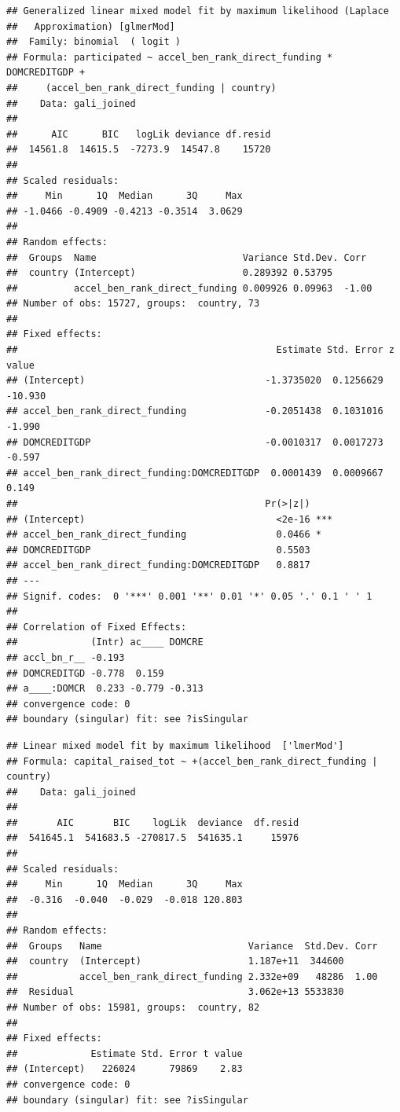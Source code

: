 \documentclass[
  english,
  man]{apa6}
\begin{document}
\begin{verbatim}
## Generalized linear mixed model fit by maximum likelihood (Laplace
##   Approximation) [glmerMod]
##  Family: binomial  ( logit )
## Formula: participated ~ accel_ben_rank_direct_funding * DOMCREDITGDP +  
##     (accel_ben_rank_direct_funding | country)
##    Data: gali_joined
## 
##      AIC      BIC   logLik deviance df.resid 
##  14561.8  14615.5  -7273.9  14547.8    15720 
## 
## Scaled residuals: 
##     Min      1Q  Median      3Q     Max 
## -1.0466 -0.4909 -0.4213 -0.3514  3.0629 
## 
## Random effects:
##  Groups  Name                          Variance Std.Dev. Corr 
##  country (Intercept)                   0.289392 0.53795       
##          accel_ben_rank_direct_funding 0.009926 0.09963  -1.00
## Number of obs: 15727, groups:  country, 73
## 
## Fixed effects:
##                                              Estimate Std. Error z value
## (Intercept)                                -1.3735020  0.1256629 -10.930
## accel_ben_rank_direct_funding              -0.2051438  0.1031016  -1.990
## DOMCREDITGDP                               -0.0010317  0.0017273  -0.597
## accel_ben_rank_direct_funding:DOMCREDITGDP  0.0001439  0.0009667   0.149
##                                            Pr(>|z|)    
## (Intercept)                                  <2e-16 ***
## accel_ben_rank_direct_funding                0.0466 *  
## DOMCREDITGDP                                 0.5503    
## accel_ben_rank_direct_funding:DOMCREDITGDP   0.8817    
## ---
## Signif. codes:  0 '***' 0.001 '**' 0.01 '*' 0.05 '.' 0.1 ' ' 1
## 
## Correlation of Fixed Effects:
##             (Intr) ac____ DOMCRE
## accl_bn_r__ -0.193              
## DOMCREDITGD -0.778  0.159       
## a____:DOMCR  0.233 -0.779 -0.313
## convergence code: 0
## boundary (singular) fit: see ?isSingular
\end{verbatim}

\begin{verbatim}
## Linear mixed model fit by maximum likelihood  ['lmerMod']
## Formula: capital_raised_tot ~ +(accel_ben_rank_direct_funding | country)
##    Data: gali_joined
## 
##       AIC       BIC    logLik  deviance  df.resid 
##  541645.1  541683.5 -270817.5  541635.1     15976 
## 
## Scaled residuals: 
##     Min      1Q  Median      3Q     Max 
##  -0.316  -0.040  -0.029  -0.018 120.803 
## 
## Random effects:
##  Groups   Name                          Variance  Std.Dev. Corr
##  country  (Intercept)                   1.187e+11  344600      
##           accel_ben_rank_direct_funding 2.332e+09   48286  1.00
##  Residual                               3.062e+13 5533830      
## Number of obs: 15981, groups:  country, 82
## 
## Fixed effects:
##             Estimate Std. Error t value
## (Intercept)   226024      79869    2.83
## convergence code: 0
## boundary (singular) fit: see ?isSingular
\end{verbatim}
\end{document}
